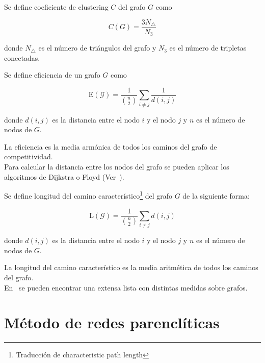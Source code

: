 \begin{defi}
	Se define coeficiente de clustering $C$ del grafo $G$ como
	
	\begin{equation}\label{eq:clustering}
	C(G) = \dfrac{3N_{\triangle}}{N_3}
	\end{equation}
	
	donde $N_{\triangle}$ es el número de triángulos del grafo y $N_3$ es el número de tripletas conectadas.
\end{defi}

\begin{defi}
	Se define eficiencia de un grafo $G$ como
	
	\begin{equation}\label{eq:eficiencia}
	\mathrm{E}(\mathcal{G}) = \dfrac{1}{\binom{n}{2}} \sum_{i\neq j} \dfrac{1}{d(i,j)}
	\end{equation}
	
	donde $d(i,j)$ es la distancia entre el nodo $i$ y el nodo $j$ y $n$ es el número de nodos de $G$.
\end{defi}

La eficiencia es la media armónica de todos los caminos del grafo de competitividad.\\

Para calcular la distancia entre los nodos del grafo se pueden aplicar los algoritmos de Dijkstra o Floyd (Ver~\cite{Cormen:2001:IA:580470}).

\begin{defi}
	Se define longitud del camino característico\footnote{Traducción de characteristic path length} del grafo $G$ de la siguiente forma:
	
	\begin{equation}\label{eq:camino}
	\mathrm{L}(\mathcal{G}) = \dfrac{1}{\binom{n}{2}} \sum_{i\neq j} d(i,j)
	\end{equation}
	
	donde $d(i,j)$ es la distancia entre el nodo $i$ y el nodo $j$ y $n$ es el número de nodos de $G$.
\end{defi}

La longitud del camino característico es la media aritmética de todos los caminos del grafo.\\

En~\cite{cond-mat/0505185} se pueden encontrar una extensa lista con distintas medidas sobre grafos. 


\section{Método de redes parenclíticas}

